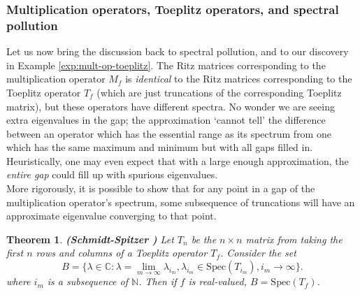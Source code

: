 \documentclass{article}
\newcommand{\Spec}{\text{Spec}}
\newcommand{\1}{\mathbf{1}}
\newtheorem{theorem}{Theorem}[section]
\begin{document}
\subsubsection{Multiplication operators, Toeplitz operators, and spectral pollution}
Let us now bring the discussion back to spectral pollution, and to our discovery in Example \ref{exp:mult-op-toeplitz}. The Ritz matrices corresponding to the
multiplication operator $M_f$ is \emph{identical} to the Ritz matrices corresponding to the Toeplitz operator $T_f$ (which are just truncations of the 
corresponding Toeplitz matrix), but these operators have different spectra. No wonder we are seeing extra eigenvalues in the gap; the approximation
`cannot tell' the difference between an operator which has the essential range as its spectrum from one which has the same maximum and minimum but with
all gaps filled in. Heuristically, one may even expect that with a large enough approximation, the \emph{entire gap} could fill up with spurious
eigenvalues.\\

More rigorously, it is possible to show that for any point in a gap of the multiplication operator's spectrum, some subsequence of truncations will have 
an approximate eigenvalue converging to that point. 

\begin{theorem}{\textbf{(Schmidt-Spitzer \parencite{schmidt1960toeplitz})}}
Let $T_n$ be the $n \times n$ matrix from taking the first $n$ rows and columns of a Toeplitz operator $T_f$. Consider the set
$$B = \{\lambda \in \mathbb{C} : \lambda = \lim_{m \rightarrow \infty} \lambda_{i_m}, \lambda_{i_m} \in \Spec(T_{i_m}), i_m \rightarrow \infty \}.$$
where $i_m$ is a subsequence of $\mathbb{N}$. Then if $f$ is real-valued, $B = \Spec(T_f)$.

\end{theorem}

\printbibliography
\end{document}
